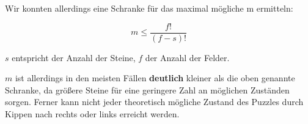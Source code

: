 	Wir konnten allerdings eine Schranke für das maximal mögliche m ermitteln:

	\[m \le \frac{f!}{(f-s)!}\]

	\(s\) entspricht der Anzahl der Steine, \(f\) der Anzahl der Felder. 

	\(m\) ist allerdings in den meisten Fällen \textbf{deutlich} kleiner als die oben genannte Schranke, da größere Steine für eine geringere Zahl an möglichen Zuständen sorgen. Ferner kann nicht jeder theoretisch mögliche Zustand des Puzzles durch Kippen nach rechts oder links erreicht werden.